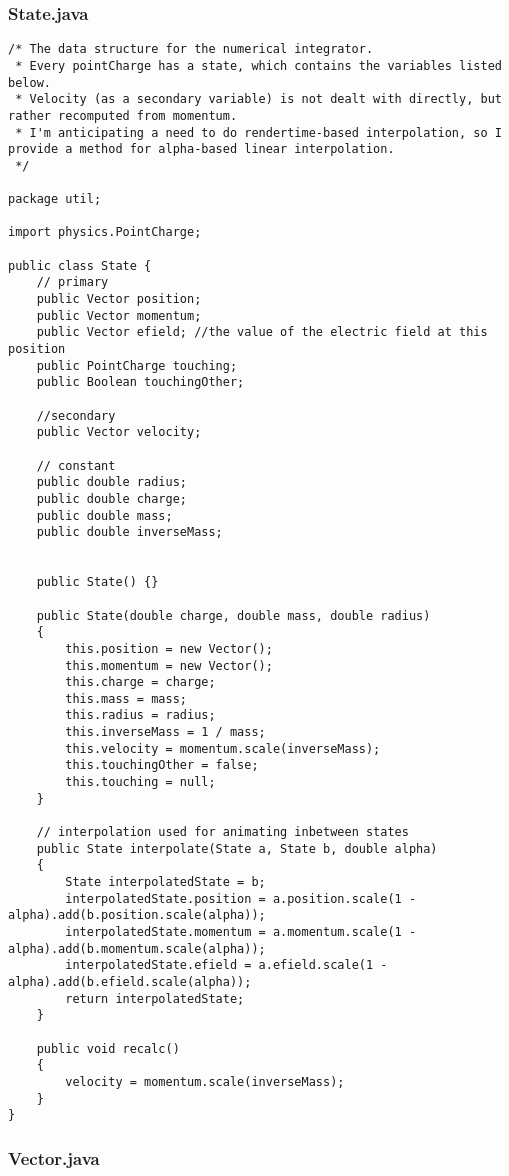 \documentclass[10pt]{article}
\begin{document}
\subsubsection{State.java}

\begin{verbatim}
/* The data structure for the numerical integrator.
 * Every pointCharge has a state, which contains the variables listed below.
 * Velocity (as a secondary variable) is not dealt with directly, but rather recomputed from momentum.
 * I'm anticipating a need to do rendertime-based interpolation, so I provide a method for alpha-based linear interpolation.
 */

package util;

import physics.PointCharge;

public class State {
	// primary
	public Vector position;
	public Vector momentum;
	public Vector efield; //the value of the electric field at this position
	public PointCharge touching;
	public Boolean touchingOther;

	//secondary
	public Vector velocity;
	
	// constant
	public double radius;
	public double charge;
	public double mass;
	public double inverseMass;


	public State() {}

	public State(double charge, double mass, double radius) 
	{
		this.position = new Vector();
		this.momentum = new Vector();
		this.charge = charge;
		this.mass = mass;
		this.radius = radius;
		this.inverseMass = 1 / mass;
		this.velocity = momentum.scale(inverseMass);
		this.touchingOther = false;
		this.touching = null;
	}

	// interpolation used for animating inbetween states
	public State interpolate(State a, State b, double alpha) 
	{
		State interpolatedState = b;
		interpolatedState.position = a.position.scale(1 - alpha).add(b.position.scale(alpha));
		interpolatedState.momentum = a.momentum.scale(1 - alpha).add(b.momentum.scale(alpha));
		interpolatedState.efield = a.efield.scale(1 - alpha).add(b.efield.scale(alpha));
		return interpolatedState;
	}
	
	public void recalc()
	{
		velocity = momentum.scale(inverseMass);
	}
}
\end{verbatim}

\subsubsection{Vector.java}
\end{document}
